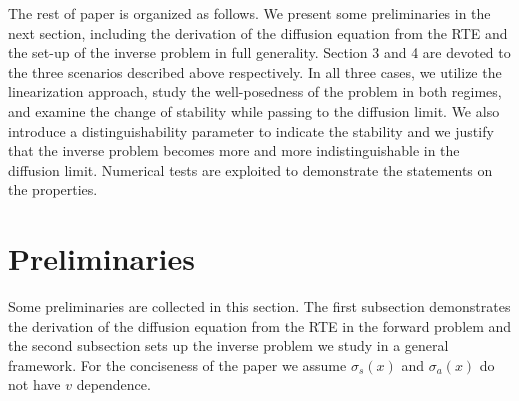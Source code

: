\documentclass[english,reqno]{amsart}
\theoremstyle{plain}
\theoremstyle{definition} %
\begin{document}
The rest of paper is organized as follows. We present some preliminaries in the next section, including the derivation of the diffusion equation from the RTE and the set-up of the inverse problem in full generality. Section 3 and 4 are devoted to the three scenarios described above respectively. In all three cases, we utilize the linearization approach, study the well-posedness of the problem in both regimes, and examine the change of stability while passing to the diffusion limit. We also introduce a distinguishability parameter to indicate the stability and we justify that the inverse problem becomes more and more indistinguishable in the diffusion limit. Numerical tests are exploited to demonstrate the statements on the properties.



\section{Preliminaries}
Some preliminaries are collected in this section. The first subsection demonstrates the derivation of the diffusion equation from the RTE in the forward problem and the second subsection sets up the inverse problem we study in a general framework. For the conciseness of the paper we assume $\sigma_s(x)$ and $\sigma_a(x)$ do not have $v$ dependence. 
\end{document}
